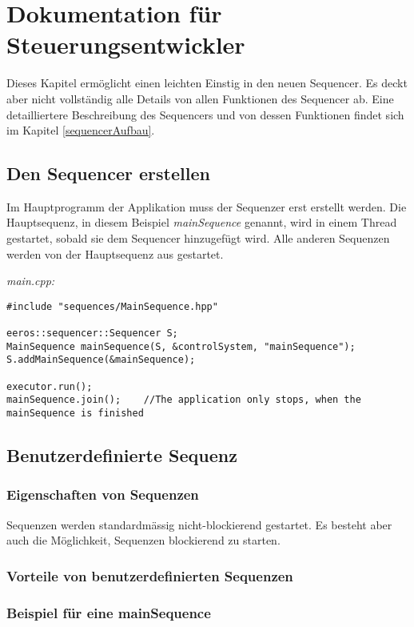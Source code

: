 \chapter{Dokumentation für Steuerungsentwickler}
Dieses Kapitel ermöglicht einen leichten Einstig in den neuen Sequencer.
Es deckt aber nicht vollständig alle Details von allen Funktionen des Sequencer ab.
Eine detailliertere Beschreibung des Sequencers und von dessen Funktionen findet sich im Kapitel \ref{sequencerAufbau}.


\section{Den Sequencer erstellen}
Im Hauptprogramm der Applikation muss der Sequenzer erst erstellt werden.
Die Hauptsequenz, in diesem Beispiel \textit{mainSequence} genannt, wird in einem Thread gestartet, sobald sie dem Sequencer hinzugefügt wird.
Alle anderen Sequenzen werden von der Hauptsequenz aus gestartet.

\textit{main.cpp:}\
\begin{lstlisting}
#include "sequences/MainSequence.hpp"

eeros::sequencer::Sequencer S;
MainSequence mainSequence(S, &controlSystem, "mainSequence");
S.addMainSequence(&mainSequence);

executor.run();
mainSequence.join();	//The application only stops, when the mainSequence is finished
\end{lstlisting}


\section{Benutzerdefinierte Sequenz}
\subsection{Eigenschaften von Sequenzen}
Sequenzen werden standardmässig nicht-blockierend gestartet.
Es besteht aber auch die Möglichkeit, Sequenzen blockierend zu starten.


\subsection{Vorteile von benutzerdefinierten Sequenzen}



\subsection{Beispiel für eine mainSequence}

